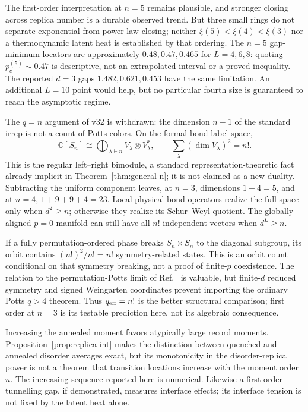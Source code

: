 The first-order interpretation at $n=5$ remains plausible, and stronger closing across replica number is a durable observed trend. But three small rings do not separate exponential from power-law closing; neither $\xi(5)<\xi(4)<\xi(3)$ nor a thermodynamic latent heat is established by that ordering. The $n=5$ gap-minimum locators are approximately $0.48,0.47,0.465$ for $L=4,6,8$: quoting $p_c^{(5)}\sim0.47$ is descriptive, not an extrapolated interval or a proved inequality. The reported $d=3$ gaps $1.482,0.621,0.453$ have the same limitation. An additional $L=10$ point would help, but no particular fourth size is guaranteed to reach the asymptotic regime.

\begin{remark}
\label{rem:whyqn}
The $q=n$ argument of v32 is withdrawn: the dimension $n-1$ of the standard irrep is not a count of Potts colors. On the formal bond-label space,
\begin{equation}
 \mathbb C[S_n]\cong\bigoplus_{\lambda\vdash n}V_\lambda\otimes V_\lambda^*,
 \qquad \sum_\lambda(\dim V_\lambda)^2=n!.
 \label{eq:regular-bimodule}
\end{equation}
This is the regular left--right bimodule, a standard representation-theoretic fact already implicit in Theorem~\ref{thm:general-n}; it is not claimed as a new duality. Subtracting the uniform component leaves, at $n=3$, dimensions $1+4=5$, and at $n=4$, $1+9+9+4=23$. Local physical bond operators realize the full space only when $d^2\ge n$; otherwise they realize its Schur--Weyl quotient. The globally aligned $p=0$ manifold can still have all $n!$ independent vectors when $d^L\ge n$.

If a fully permutation-ordered phase breaks $S_n\times S_n$ to the diagonal subgroup, its orbit contains $(n!)^2/n!=n!$ symmetry-related states. This is an orbit count conditional on that symmetry breaking, not a proof of finite-$p$ coexistence. The relation to the permutation-Potts limit of Ref.~\cite{Vasseur2019} is valuable, but finite-$d$ reduced symmetry and signed Weingarten coordinates prevent importing the ordinary Potts $q>4$ theorem. Thus $q_{\rm eff}=n!$ is the better structural comparison; first order at $n=3$ is its testable prediction here, not its algebraic consequence.

Increasing the annealed moment favors atypically large record moments. Proposition~\ref{prop:replica-int} makes the distinction between quenched and annealed disorder averages exact, but its monotonicity in the disorder-replica power is not a theorem that transition locations increase with the moment order $n$. The increasing sequence reported here is numerical. Likewise a first-order tunnelling gap, if demonstrated, measures interface effects; its interface tension is not fixed by the latent heat alone.
\end{remark}

